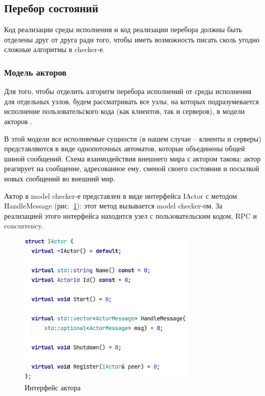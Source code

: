 \subsection{Перебор состояний}

Код реализации среды исполнения и код реализации перебора должны быть отделены друг от друга ради того, чтобы иметь возможность писать сколь угодно сложные алгоритмы в checker-е.

\subsubsection{Модель акторов}

Для того, чтобы отделить алгоритм перебора исполнений от среды исполнения для отдельных узлов, будем рассматривать все узлы, на которых подразумевается  исполнение пользовательского кода (как клиентов, так и серверов), в модели акторов \cite{actor}. 

В этой модели все исполняемые сущности (в нашем случае – клиенты и серверы) представляются в виде однопоточных автоматов, которые объединены общей шиной сообщений. Схема взаимодействия внешнего мира с актором такова: актор реагирует на сообщение, адресованное ему, сменой своего состояния и посылкой новых сообщений во внешний мир.

Актор в model checker-е представлен в виде интерфейса IActor с методом HandleMessage (рис.~\ref{fig:actor}): этот метод вызывается model checker-ом. За реализацией этого интерфейса находится узел с пользовательским кодом, RPC и concurrency.

\begin{figure}[h]
    \centering
    \includegraphics[width=0.75\textwidth]{img/actor.png}
    \caption{Интерфейс актора}
    \label{fig:actor}
\end{figure}

